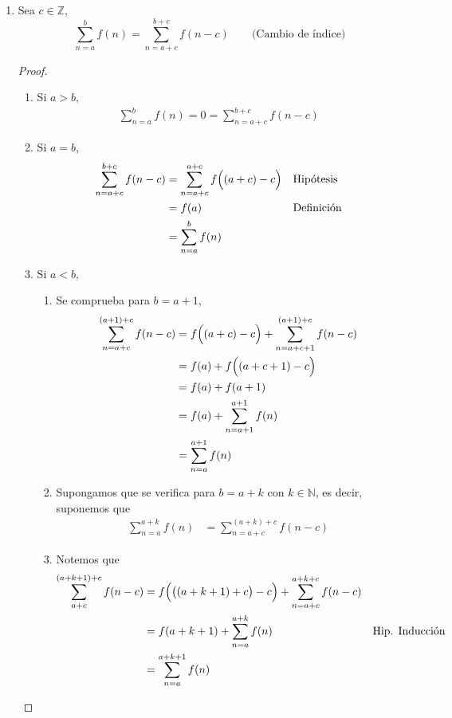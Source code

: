 \documentclass[11pt]{article}
\newcommand{\N}{\mathbb{N}}
\newcommand{\Z}{\mathbb{Z}}
\begin{document}
\begin{enumerate}[label=\alph*)]
  \item Sea $c\in \Z$, \[\sum_{n=a}^b f(n) = \sum_{n=a+c}^{b+c} f(n-c) \qquad \text{(Cambio de índice)}\]
  \begin{proof}\leavevmode
    \begin{enumerate}[label=\Roman*)]
      \item Si $a>b$, \begin{align*}
        \sum_{n=a}^b f(n) = 0 = \sum_{n=a+c}^{b+c} f(n-c)
      \end{align*}
      \item Si $a=b$, \begin{align*}
        \sum_{n=a+c}^{b+c} f(n-c) &= \sum_{n=a+c}^{a+c} f\Bigl((a+c)-c\Bigr) && \text{Hipótesis}\\
        &= f(a) && \text{Definición}\\
        &= \sum_{n=a}^b f(n)
      \end{align*}
      \item Si $a<b$, \begin{enumerate}[label=\roman*)]
        \item Se comprueba para $b=a+1$, \begin{align*}
          \sum_{n=a+c}^{(a+1)+c} f(n-c) &= f\Bigl((a+c)-c\Bigr) + \sum_{n=a+c+1}^{(a+1)+c} f(n-c)\\
          &= f(a) + f\Bigl((a+c+1)-c\Bigr)\\
          &= f(a) + f(a+1)\\
          &= f(a) + \sum_{n=a+1}^{a+1} f(n) \\
          &= \sum_{n=a}^{a+1} f(n)
        \end{align*}
        \item Supongamos que se verifica para $b=a+k$ con $k\in \N$, es decir, suponemos que \begin{align*}
          \sum_{n=a}^{a+k} f(n) &= \sum_{n=a+c}^{(a+k)+c} f(n-c)
        \end{align*}
        \item Notemos que \begin{align*}
          \sum_{a+c}^{(a+k+1)+c} f(n-c) &= f\Bigl(\bigl((a+k+1)+c\bigr)-c\Bigr) + \sum_{n=a+c}^{a+k+c} f(n-c)\\
          &= f(a+k+1) + \sum_{n=a}^{a+k} f(n) && \text{Hip. Inducción}\\
          &= \sum_{n=a}^{a+k+1} f(n)
        \end{align*}
      \end{enumerate}
    \end{enumerate}
  \end{proof}


\end{enumerate}
\end{document}
